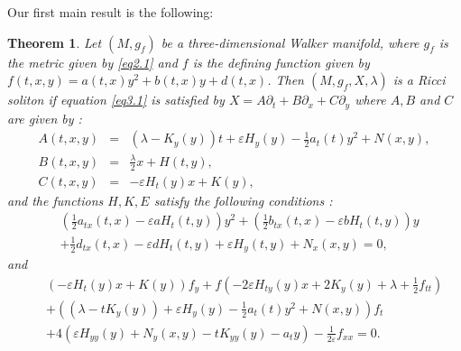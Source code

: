 \documentclass[reqno, 12pt]{amsart}
\numberwithin{equation}{section}
\newtheorem{theorem}{Theorem}[section]
\begin{document}
 Our first main result is the following:

\begin{theorem}
Let $(M, g_f)$ be a three-dimensional Walker manifold, where $g_f$ is the metric 
given by \eqref{eq2.1} and $f$ is the defining function given by 
$f(t,x,y) = a(t,x) y^{2} + b(t,x) y + d(t,x)$.  Then $(M, g_f, X, \lambda)$ is a Ricci soliton 
if equation \eqref{eq3.1} is satisfied by $X = A\partial_t+ B\partial_x + C \partial_y $ 
where $A, B $ and $C$ are given by :
\begin{eqnarray}\label{eq3.3}
A(t,x, y) &=& \left( \lambda-K_y(y)\right)t + \varepsilon H_{y}(y)
- \frac{1}{2}a_{t}(t)y^2 +N(x,y), \nonumber\\ 
B(t,x,y) &=&\frac{\lambda}{2}x + H(t,y),\nonumber\\
C(t,x,y)&=& -\varepsilon H_{t}(y)x+K(y),
\end{eqnarray}
and the functions $H, K, E$ satisfy the following conditions :
\begin{align*}
&\left( \frac{1}{2}a_{tx}(t,x)	-\varepsilon aH_{t}(t,y)\right) y^{2}
+ \left(  \frac{1}{2}b_{tx}(t,x)-\varepsilon bH_{t}(t,y)\right) y\nonumber\\
& + \frac{1}{2}d_{tx}(t,x)-\varepsilon dH_{t}(t,y)+\varepsilon H_{y}(t,y) + N_{x}(x,y) = 0,
\end{align*} 
and
\begin{align*}
&&\left(-\varepsilon H_{t}(y)x + K(y)\right) f_y + f\left( -2\varepsilon H_{ty}(y)x
+ 2K_y(y) + \lambda + \frac{1}{2}f_{tt}\right)\nonumber  \\
&& + \left( ( \lambda - tK_y(y)) + \varepsilon H_{y}(y) - \frac{1}{2}a_{t}(t)y^2 
+ N(x,y)\right) f_t\nonumber\\
&& + 4\left(\varepsilon H_{yy}(y) + N_y(x,y) - tK_{yy}(y) - a_ty \right) 
- \frac{1}{2\varepsilon}f_{xx}=0.
\end{align*}
\end{theorem}
	
\end{document}
